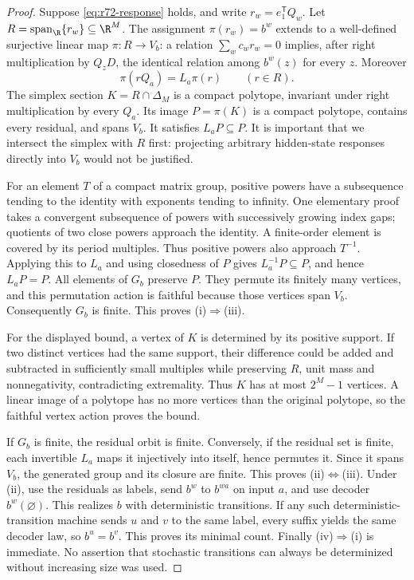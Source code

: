 \begin{proof}
Suppose \eqref{eq:r72-response} holds, and write $r_w=e_1^{\mathsf T}Q_w$. Let $R=\operatorname{span}_{\R}\{r_w\}\subseteq\R^M$. The assignment $\pi(r_w)=b^w$ extends to a well-defined surjective linear map $\pi:R\to V_b$: a relation $\sum_wc_wr_w=0$ implies, after right multiplication by $Q_zD$, the identical relation among $b^w(z)$ for every $z$. Moreover
\[
 \pi(rQ_a)=L_a\pi(r)\qquad(r\in R).
\]
The simplex section $K=R\cap\Delta_M$ is a compact polytope, invariant under right multiplication by every $Q_a$. Its image $P=\pi(K)$ is a compact polytope, contains every residual, and spans $V_b$. It satisfies $L_aP\subseteq P$. It is important that we intersect the simplex with $R$ first: projecting arbitrary hidden-state responses directly into $V_b$ would not be justified.

For an element $T$ of a compact matrix group, positive powers have a subsequence tending to the identity with exponents tending to infinity. One elementary proof takes a convergent subsequence of powers with successively growing index gaps; quotients of two close powers approach the identity. A finite-order element is covered by its period multiples. Thus positive powers also approach $T^{-1}$. Applying this to $L_a$ and using closedness of $P$ gives $L_a^{-1}P\subseteq P$, and hence $L_aP=P$. All elements of $G_b$ preserve $P$. They permute its finitely many vertices, and this permutation action is faithful because those vertices span $V_b$. Consequently $G_b$ is finite. This proves (i)$\Rightarrow$(iii).

For the displayed bound, a vertex of $K$ is determined by its positive support. If two distinct vertices had the same support, their difference could be added and subtracted in sufficiently small multiples while preserving $R$, unit mass and nonnegativity, contradicting extremality. Thus $K$ has at most $2^M-1$ vertices. A linear image of a polytope has no more vertices than the original polytope, so the faithful vertex action proves the bound.

If $G_b$ is finite, the residual orbit is finite. Conversely, if the residual set is finite, each invertible $L_a$ maps it injectively into itself, hence permutes it. Since it spans $V_b$, the generated group and its closure are finite. This proves (ii)$\Leftrightarrow$(iii). Under (ii), use the residuals as labels, send $b^w$ to $b^{wa}$ on input $a$, and use decoder $b^w(\varnothing)$. This realizes $b$ with deterministic transitions. If any such deterministic-transition machine sends $u$ and $v$ to the same label, every suffix yields the same decoder law, so $b^u=b^v$. This proves its minimal count. Finally (iv)$\Rightarrow$(i) is immediate. No assertion that stochastic transitions can always be determinized without increasing size was used.
\end{proof}

